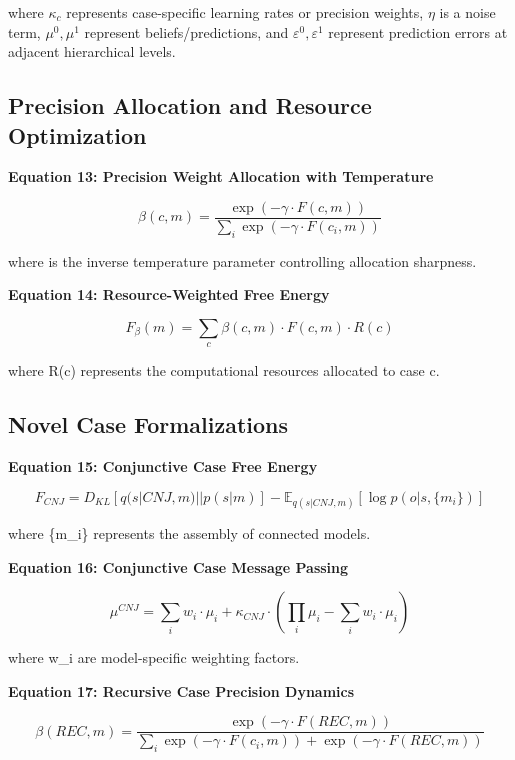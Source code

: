 \documentclass[
  11pt,
  letterpaper,
]{article}
\begin{document}
where \(\kappa_c\) represents case-specific learning rates or precision
weights, \(\eta\) is a noise term, \(\mu^0, \mu^1\) represent
beliefs/predictions, and \(\varepsilon^0, \varepsilon^1\) represent
prediction errors at adjacent hierarchical levels.

\hypertarget{precision-allocation-and-resource-optimization}{%
\subsection{Precision Allocation and Resource
Optimization}\label{precision-allocation-and-resource-optimization}}

\textbf{Equation 13: Precision Weight Allocation with Temperature}

\[\beta(c,m) = \frac{\exp(-\gamma \cdot F(c,m))}{\sum_i \exp(-\gamma \cdot F(c_i,m))}  \tag{13}\]

where is the inverse temperature parameter controlling allocation
sharpness.

\textbf{Equation 14: Resource-Weighted Free Energy}

\[F_{\beta}(m) = \sum_c \beta(c,m) \cdot F(c,m) \cdot R(c)  \tag{14}\]

where R(c) represents the computational resources allocated to case c.

\hypertarget{novel-case-formalizations}{%
\subsection{Novel Case Formalizations}\label{novel-case-formalizations}}

\textbf{Equation 15: Conjunctive Case Free Energy}

\[
F_{CNJ} = D_{KL}[q(s|CNJ,m) || p(s|m)] - \mathbb{E}_{q(s|CNJ,m)}[\log p(o|s,\{m_i\})]  \tag{15}
\]

where \{m\_i\} represents the assembly of connected models.

\textbf{Equation 16: Conjunctive Case Message Passing}

\[\mu^{CNJ} = \sum_i w_i \cdot \mu_i + \kappa_{CNJ} \cdot (\prod_i \mu_i - \sum_i w_i \cdot \mu_i)  \tag{16}\]

where w\_i are model-specific weighting factors.

\textbf{Equation 17: Recursive Case Precision Dynamics}

\[\beta(REC,m) = \frac{\exp(-\gamma \cdot F(REC,m))}{\sum_i \exp(-\gamma \cdot F(c_i,m)) + \exp(-\gamma \cdot F(REC,m))}  \tag{17}\]
\end{document}
